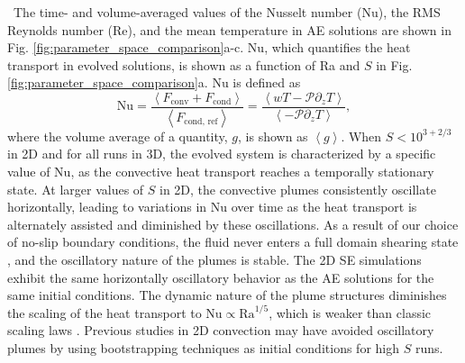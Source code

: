 \documentclass[aps, pre, onecolumn, nofootinbib, notitlepage, groupedaddress, amsfonts, amssymb, amsmath, longbibliography]{revtex4-1}
\newcommand{\angles}[1]{\ensuremath{\left\langle #1 \right\rangle}}
\begin{document}
\vspace{5cm}
$\,$\newline
The time- and volume-averaged values of the Nusselt number (Nu), the RMS
Reynolds number (Re), and the mean temperature in AE solutions 
are shown in Fig. \ref{fig:parameter_space_comparison}a-c.
Nu, which quantifies the heat transport in evolved solutions,
is shown as a function of Ra and $S$ in Fig. \ref{fig:parameter_space_comparison}a.
Nu is defined as
\begin{equation}
\text{Nu} = \frac{\angles{F_{\text{conv}} + F_{\text{cond}}}}{\angles{F_{\text{cond, ref}}}}
 = \frac{\angles{wT - \mathcal{P}\partial_z T}}{\angles{- \mathcal{P} \partial_z T}},
\end{equation}
where the volume average of a quantity, $g$, is shown as $\angles{g}$.
When $S < 10^{3+2/3}$ in 2D and for all runs in 3D, 
the evolved system is characterized by a specific
value of Nu, as the convective heat transport reaches a temporally stationary state.
At larger values of $S$ in 2D, the convective plumes consistently oscillate
horizontally, leading to variations in Nu over time as the heat transport is alternately
assisted and diminished by these oscillations.
As a result of our choice of no-slip
boundary conditions, the fluid never enters a full domain shearing state 
\cite{goluskin&all2014}, and the
oscillatory nature of the plumes is stable.
The 2D SE simulations exhibit the same horizontally
oscillatory behavior as the AE solutions for the same initial conditions. The
dynamic nature of the plume structures diminishes the
scaling of the heat transport to $\text{Nu} \propto \text{Ra}^{1/5}$,
which is weaker than classic scaling laws \cite{johnston&doering2009, ahlers&all2009}.
Previous studies in 2D convection may have avoided oscillatory plumes by using
bootstrapping techniques as initial conditions for high $S$ runs.
\end{document}
